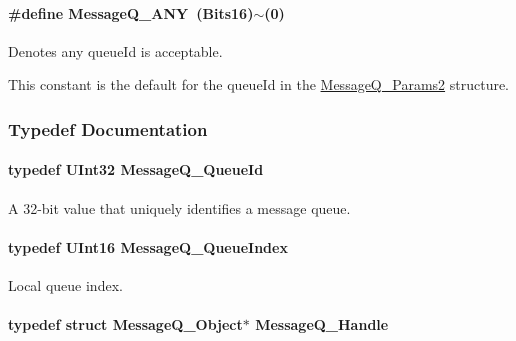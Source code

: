 \paragraph[{Message\-Q\-\_\-\-A\-N\-Y}]{\setlength{\rightskip}{0pt plus 5cm}\#define Message\-Q\-\_\-\-A\-N\-Y~(Bits16)$\sim$(0)}\label{_message_q_8h_ad362a4aed0277886db9c82bb5071c0f0}


Denotes any queue\-Id is acceptable. 

This constant is the default for the queue\-Id in the \hyperlink{struct_message_q___params2}{Message\-Q\-\_\-\-Params2} structure. 

\subsubsection{Typedef Documentation}
\paragraph[{Message\-Q\-\_\-\-Queue\-Id}]{\setlength{\rightskip}{0pt plus 5cm}typedef U\-Int32 {\bf Message\-Q\-\_\-\-Queue\-Id}}\label{_message_q_8h_a34dd32b58cf0476c2d90e3f702843297}


A 32-\/bit value that uniquely identifies a message queue. 

\paragraph[{Message\-Q\-\_\-\-Queue\-Index}]{\setlength{\rightskip}{0pt plus 5cm}typedef U\-Int16 {\bf Message\-Q\-\_\-\-Queue\-Index}}\label{_message_q_8h_a22a5f41fd82f03f7c14f45dab647bada}


Local queue index. 

\paragraph[{Message\-Q\-\_\-\-Handle}]{\setlength{\rightskip}{0pt plus 5cm}typedef struct Message\-Q\-\_\-\-Object$\ast$ {\bf Message\-Q\-\_\-\-Handle}}\label{_message_q_8h_a1d584ce08733ca864d81e1e64a41cf7a}


